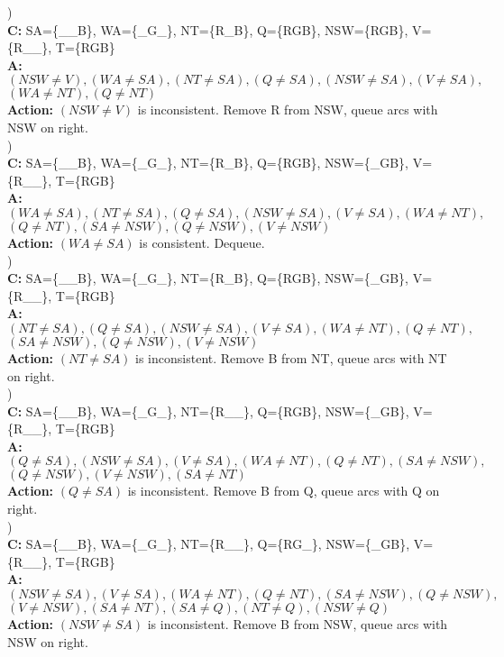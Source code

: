 \documentclass[12pt]{article}
\begin{document}
)\hrulefill\\
\textbf{C:} SA=\{\_\_B\}, WA=\{\_G\_\}, NT=\{R\_B\}, Q=\{RGB\}, NSW=\{RGB\}, V=\{R\_\_\}, T=\{RGB\}\\
\textbf{A:} $(NSW\neq V), (WA\neq SA), (NT\neq SA), (Q\neq SA), (NSW\neq SA), (V\neq SA), $ \\
\indent $(WA\neq NT), (Q\neq NT) $\\
\textbf{Action:} $(NSW\neq V)$ is inconsistent. Remove R from NSW, queue arcs with NSW on right.\\

)\hrulefill\\
\textbf{C:} SA=\{\_\_B\}, WA=\{\_G\_\}, NT=\{R\_B\}, Q=\{RGB\}, NSW=\{\_GB\}, V=\{R\_\_\}, T=\{RGB\}\\
\textbf{A:} $(WA\neq SA), (NT\neq SA), (Q\neq SA), (NSW\neq SA), (V\neq SA), (WA\neq NT), $ \\
\indent $(Q\neq NT), (SA\neq NSW), (Q\neq NSW), (V\neq NSW)$\\
\textbf{Action:} $(WA\neq SA)$ is consistent. Dequeue.\\

)\hrulefill\\
\textbf{C:} SA=\{\_\_B\}, WA=\{\_G\_\}, NT=\{R\_B\}, Q=\{RGB\}, NSW=\{\_GB\}, V=\{R\_\_\}, T=\{RGB\}\\
\textbf{A:} $(NT\neq SA), (Q\neq SA), (NSW\neq SA), (V\neq SA), (WA\neq NT), (Q\neq NT), $ \\
\indent $(SA\neq NSW), (Q\neq NSW), (V\neq NSW)$\\
\textbf{Action:} $(NT\neq SA)$ is inconsistent. Remove B from NT, queue arcs with NT on right.\\

)\hrulefill\\
\textbf{C:} SA=\{\_\_B\}, WA=\{\_G\_\}, NT=\{R\_\_\}, Q=\{RGB\}, NSW=\{\_GB\}, V=\{R\_\_\}, T=\{RGB\}\\
\textbf{A:} $(Q\neq SA), (NSW\neq SA), (V\neq SA), (WA\neq NT), (Q\neq NT), (SA\neq NSW), $ \\
\indent $(Q\neq NSW), (V\neq NSW), (SA\neq NT)$\\
\textbf{Action:} $(Q\neq SA)$ is inconsistent. Remove B from Q, queue arcs with Q on right.\\

)\hrulefill\\
\textbf{C:} SA=\{\_\_B\}, WA=\{\_G\_\}, NT=\{R\_\_\}, Q=\{RG\_\}, NSW=\{\_GB\}, V=\{R\_\_\}, T=\{RGB\}\\
\textbf{A:} $(NSW\neq SA), (V\neq SA), (WA\neq NT), (Q\neq NT), (SA\neq NSW), (Q\neq NSW), $ \\
\indent $(V\neq NSW), (SA\neq NT), (SA\neq Q), (NT\neq Q), (NSW\neq Q)$\\
\textbf{Action:} $(NSW\neq SA)$ is inconsistent. Remove B from NSW, queue arcs with NSW on right.\\
\end{document}
